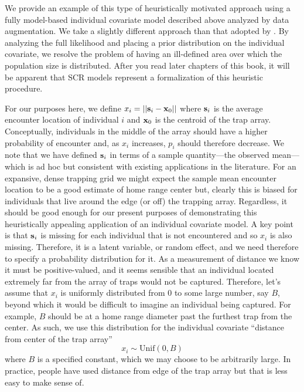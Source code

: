 We provide an example of this type of heuristically motivated
approach using a fully model-based individual covariate model
described above analyzed by data augmentation. We take a slightly
different approach than that adopted by
\citet{boulanger_mclellan:2001}. By analyzing the full likelihood and
placing a prior distribution on the individual covariate, we resolve
the problem of having an ill-defined area over which the population
size is distributed. After you read later chapters of this book, it
will be apparent that SCR models represent a formalization of this
heuristic procedure.

For our purposes here, we define $x_{i} = ||{\bf s}_{i} - {\bf
  x}_{0}||$ where ${\bf s}_{i}$ is the average encounter location of
individual $i$ and ${\bf x}_{0}$ is the centroid of the trap array.
Conceptually, individuals in the middle of the array should have a
higher probability of encounter and, as $x_{i}$ increases, $p_{i}$
should therefore decrease. We note that we have defined ${\bf s}_{i}$
in terms of a sample quantity---the observed mean---which is ad hoc
but consistent with existing applications in the literature.  For an
expansive, dense trapping grid we might expect the sample mean
encounter location to be a good estimate of home range center but,
clearly this is biased for individuals that live around the edge (or
off) the trapping array. Regardless, it should be good enough for our
present purposes of demonstrating this heuristically appealing
application of an individual covariate model. A key point is that
${\bf s}_{i}$ is missing for each individual that is not encountered
and so  $x_{i}$ is also missing. Therefore, it is a latent variable, or random
effect, and we need therefore to specify a probability distribution
for it.  As a measurement of distance we know it must be
positive-valued, and it seems sensible that an individual located
extremely far from the array of traps would not be captured.
Therefore, let's assume that $x_{i}$ is uniformly distributed from $0$ to some large number,
say $B$, beyond which it would be difficult to imagine an
individual being captured. For example, $B$ should be at a home
range diameter past the furthest trap from the center.  As such, we
use this distribution for the individual covariate ``distance from
center of the trap array''
\[
 x_{i} \sim \mbox{Unif}(0,B)
\]
where $B$ is a specified constant, which we may choose to be
arbitrarily large.  In practice, people have
used distance from edge of the trap array but that is less easy to
make sense of.



